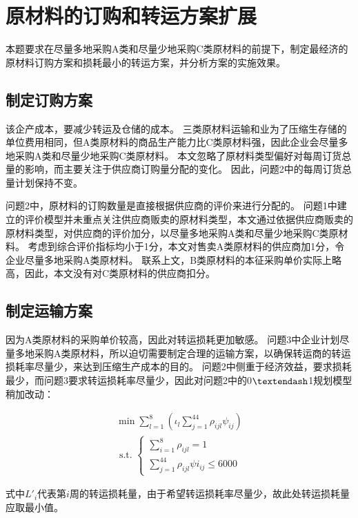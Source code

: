 
\section{原材料的订购和转运方案扩展}

本题要求在尽量多地采购A类和尽量少地采购C类原材料的前提下，制定最经济的原材料订购方案和损耗最小的转运方案，并分析方案的实施效果。

\subsection{制定订购方案}

该企产成本，要减少转运及仓储的成本。
三类原材料运输和业为了压缩生存储的单位费用相同，但A类原材料的商品生产能力比C类原材料强，因此企业会尽量多地采购A类和尽量少地采购C类原材料。
本文忽略了原材料类型偏好对每周订货总量的影响，而主要关注于供应商订购量分配的变化。
因此，问题2中的每周订货总量计划保持不变。

问题2中，原材料的订购数量是直接根据供应商的评价来进行分配的。
问题1中建立的评价模型并未重点关注供应商贩卖的原材料类型，本文通过依据供应商贩卖的原材料类型，对供应商的评价加分，以尽量多地采购A类和尽量少地采购C类原材料。
考虑到综合评价指标均小于1分，本文对售卖A类原材料的供应商加1分，令企业尽量多地采购A类原材料。
联系上文，B类原材料的本征采购单价实际上略高，因此，本文没有对C类原材料的供应商扣分。

\subsection{制定运输方案}

因为A类原材料的采购单价较高，因此对转运损耗更加敏感。
问题3中企业计划尽量多地采购A类原材料，所以迫切需要制定合理的运输方案，以确保转运商的转运损耗率尽量少，来达到压缩生产成本的目的。
问题2中侧重于经济效益，要求损耗最少，而问题3要求转运损耗率尽量少，因此对问题2中的0$\textendash$1规划模型稍加改动：

\begin{equation}
\begin{array}{l}
\min \sum_{l=1}^{8}\left(\iota_{l} \sum_{j=1}^{44} \rho_{i j l} \psi_{i j}\right) \\
\text { s.t. }\left\{\begin{array}{l}
\sum_{i=1}^{8} \rho_{i j l}=1 \\
\sum_{j=1}^{44} \rho_{i j l} \psi i_{i j} \leq 6000
\end{array}\right.
\end{array}
\end{equation}

式中$L'_i$代表第$i$周的转运损耗量，由于希望转运损耗率尽量少，故此处转运损耗量应取最小值。
